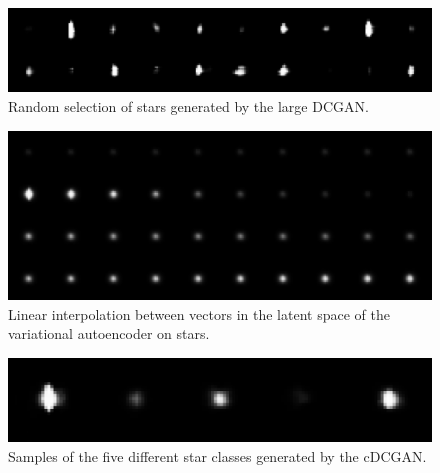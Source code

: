 \documentclass[10pt,conference,compsocconf]{IEEEtran}
\begin{document}
\begin{figure}%
    \centering
    \includegraphics[width=\columnwidth]{assets/star_ensemble_large_resized.png}
    \caption{Random selection of stars generated by the large DCGAN.}
    \label{fig:dcgan_stars}
\end{figure}

\begin{figure}
    \centering
    \includegraphics[width=\columnwidth]{assets/vae_interpolation_resized.png}
    \caption{Linear interpolation between vectors in the latent space of the variational autoencoder on stars.}
    \label{fig:vae_interpolation}
\end{figure}

\begin{figure}
    \centering
    \includegraphics[width=\columnwidth]{assets/clustered_generated_stars_resized.png}
    \caption{Samples of the five different star classes generated by the cDCGAN.}
    \label{fig:clustered_generated_stars}
\end{figure}

\end{document}
